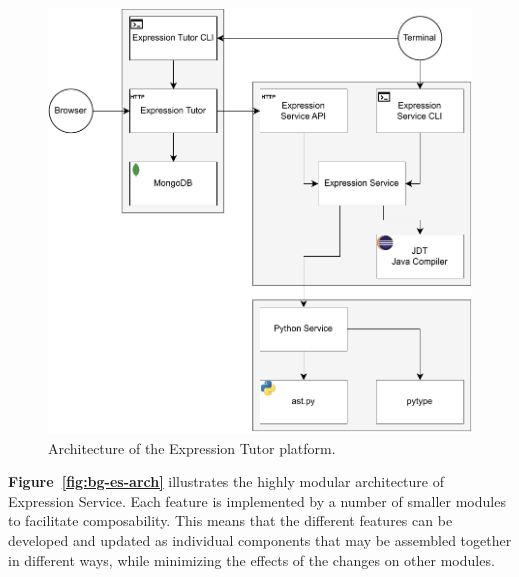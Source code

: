 \begin{chapterBody}
\begin{figure}[ht]
    \centering
    \includegraphics[width=0.6\linewidth]{res/2/et_arch.drawio.pdf}
    \caption{Architecture of the Expression Tutor platform.}
    \label{fig:bg-et-arch}
\end{figure}

\textbf{Figure~\ref{fig:bg-es-arch}} illustrates the highly modular architecture
of Expression Service. Each feature is implemented by a number of smaller 
modules to facilitate composability. This means that the different features can
be developed and updated as individual components that may be assembled
together in different ways, while minimizing the effects of the changes on
other modules.

\end{chapterBody}
